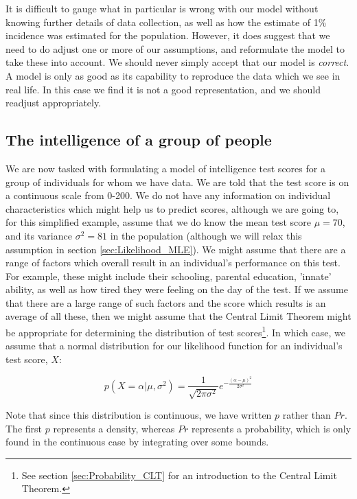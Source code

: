 \documentclass[11pt,fullpage]{book}
\begin{document}
It is difficult to gauge what in particular is wrong with our model without knowing further details of data collection, as well as how the estimate of 1\% incidence was estimated for the population. However, it does suggest that we need to do adjust one or more of our assumptions, and reformulate the model to take these into account. We should never simply accept that our model is \textit{correct}. A model is only as good as its capability to reproduce the data which we see in real life. In this case we find it is not a good representation, and we should readjust appropriately.

\subsection{The intelligence of a group of people}\label{sec:Likelihood_normal}
We are now tasked with formulating a model of intelligence test scores for a group of individuals for whom we have data. We are told that the test score is on a continuous scale from 0-200. We do not have any information on individual characteristics which might help us to predict scores, although we are going to, for this simplified example, assume that we do know the mean test score $\mu=70$, and its variance $\sigma^2=81$ in the population (although we will relax this assumption in section \ref{sec:Likelihood_MLE}). We might assume that there are a range of factors which overall result in an individual's performance on this test. For example, these might include their schooling, parental education, 'innate' ability, as well as how tired they were feeling on the day of the test. If we assume that there are a large range of such factors and the score which results is an average of all these, then we might assume that the Central Limit Theorem might be appropriate for determining the distribution of test scores\footnote{See section \ref{sec:Probability_CLT} for an introduction to the Central Limit Theorem.}. In which case, we assume that a normal distribution for our likelihood function for an individual's test score, $X$:

\begin{equation}
p(X=\alpha|\mu,\sigma^2) = \frac{1}{\sqrt{2\pi\sigma^2}}e^{-\frac{(\alpha-\mu)^2}{2\sigma^2}}
\end{equation}\label{eq:Likelihood_normal}

Note that since this distribution is continuous, we have written $p$ rather than $Pr$. The first $p$ represents a density, whereas $Pr$ represents a probability, which is only found in the continuous case by integrating over some bounds.
\end{document}
